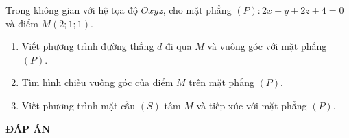 \begin{bt}%
Trong không gian với hệ tọa độ $Oxyz$, cho  mặt phẳng $(P)\colon2x-y+2z+4=0$ và điểm $M\left(2;1;1\right)$.
\begin{enumerate}
	\item Viết phương trình đường thẳng $d$ đi qua $M$ và vuông góc với mặt phẳng $(P)$.
\item Tìm hình chiếu vuông góc của điểm $M$ trên mặt phẳng $(P)$.
\item Viết phương trình mặt cầu $(S)$ tâm $M$ và tiếp xúc với mặt phẳng $(P)$.
\end{enumerate}
\end{bt}
\newpage
\begin{center}
	\textbf{ĐÁP ÁN}
\end{center}
\begin{multicols}{10}
	
\end{multicols}
